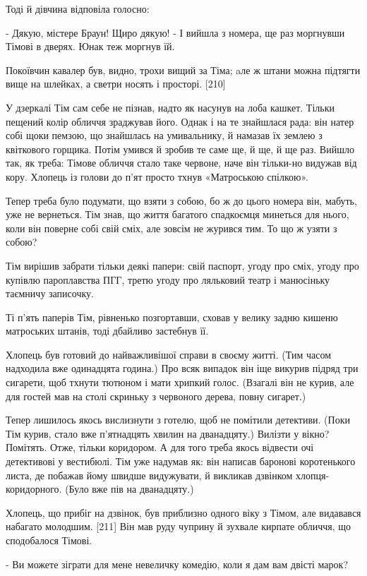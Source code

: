 Тоді й дівчина відповіла голосно:

- Дякую, містере Браун! Щиро дякую! - І вийшла з номера, ще раз моргнувши Тімові в дверях. Юнак теж моргнув їй.

Покоївчин кавалер був, видно, трохи вищий за Тіма; aле ж штани можна підтягти вище на шлейках, а светри носять і просторі. [210]

У дзеркалі Тім сам себе не пізнав, надто як насунув на лоба кашкет. Тільки пещений колір обличчя зраджував його. Однак і на те знайшлася рада: він натер собі щоки пемзою, що знайшлась на умивальнику, й намазав їх землею з квіткового горщика. Потім умився й зробив те саме ще, й ще, й ще раз. Вийшло так, як треба: Тімове обличчя стало таке червоне, наче він тільки-но видужав від кору. Хлопець із голови до п'ят просто тхнув «Матроською спілкою».

Тепер треба було подумати, що взяти з собою, бо ж до цього номера він, мабуть, уже не вернеться. Тім знав, що життя багатого спадкоємця минеться для нього, коли він поверне собі свій сміх, але зовсім не журився тим. То що ж узяти з собою?

Тім вирішив забрати тільки деякі папери: свій паспорт, угоду про сміх, угоду про купівлю пароплавства ПГГ, третю угоду про ляльковий театр і манюсіньку таємничу записочку.

Ті п'ять паперів Тім, рівненько позгортавши, сховав у велику задню кишеню матроських штанів, тоді дбайливо застебнув її.

Хлопець був готовий до найважливішої справи в своєму житті. (Тим часом надходила вже одинадцята година.) Про всяк випадок він іще викурив підряд три сигарети, щоб тхнути тютюном і мати хрипкий голос. (Взагалі він не курив, але для гостей мав на столі скриньку з червоного дерева, повну сигарет.)

Тепер лишилось якось вислизнути з готелю, щоб не помітили детективи. (Поки Тім курив, стало вже п'ятнадцять хвилин на дванадцяту.) Вилізти у вікно? Помітять. Отже, тільки коридором. А для того треба якось відвести очі детективові у вестибюлі. Тім уже надумав як: він написав баронові коротенького листа, де побажав йому швидше видужувати, й викликав дзвінком хлопця-коридорного. (Було вже пів на дванадцяту.)

Хлопець, що прибіг на дзвінок, був приблизно одного віку з Тімом, але видавався набагато молодшим. [211] Він мав руду чуприну й зухвале кирпате обличчя, що сподобалося Тімові.

- Ви можете зіграти для мене невеличку комедію, коли я дам вам двісті марок?


